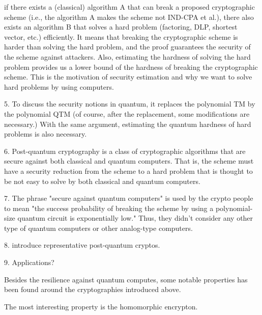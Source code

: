 
if there exists a (classical) algorithm A that can break
a proposed cryptographic scheme (i.e., the algorithm A makes the scheme not IND-CPA et al.),
there also exists an algorithm B that solves a hard problem (factoring, DLP, shortest vector, etc.) efficiently.
It means that breaking the cryptographic scheme is harder than solving the hard problem, and the proof guarantees
the security of the scheme against attackers.
Also, estimating the hardness of solving the hard problem provides us a lower bound of the hardness of breaking the cryptographic scheme.
This is the motivation of security estimation and why we want to solve hard problems by using computers.

5. To discuss the security notions in quantum, it replaces the polynomial TM by the polynomial QTM  (of course, after the replacement, some modifications are necessary.)
With the same argument, estimating the quantum hardness of hard problems is also necessary.

6. Post-quantum cryptography is a class of cryptographic algorithms that are secure against both classical and quantum computers.
That is, the scheme must have a security reduction from the scheme to a hard problem that is thought to be not easy to solve by both classical and quantum computers.

7. The phrase "secure against quantum computers" is used by the crypto people to mean "the success probability of breaking the scheme by using
a polynomial-size quantum circuit is exponentially low."
Thus, they didn't consider any other type of quantum computers or other analog-type computers.

8. introduce representative post-quantum cryptos.

9. Applications?

\fi




Besides the resilience against quantum computes, 
some notable properties has been found around the cryptographies
introduced above.

The most interesting property is the homomorphic encrypton.





